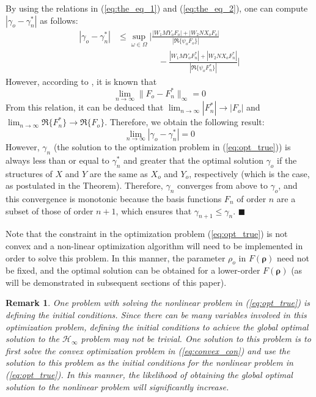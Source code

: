 \documentclass[letterpaper, 10 pt, conference]{ieeeconf}  %
\newtheorem*{remark*}{Remark}
\begin{document}
By using the relations in (\ref{eq:the_eq_1}) and (\ref{eq:the_eq_2}), one can compute $|\gamma_o - \gamma_n^*|$ as follows:
\begin{equation}
\begin{split}
|\gamma_o - \gamma_n^*|  & \leq \sup_{\omega \in \Omega} \bigg| \frac{|W_1MY_oF_o| + |W_2NX_oF_o|}{|\Re \{\psi_o F_o \}|}  \\  & \hspace{2cm}- \frac{|W_1MY_oF_n^*| + |W_2NX_oF_n^*|}{| \Re \{\psi_o F_n^* \}|} \bigg|
\end{split}
\end{equation}
However, according to \cite{AN99b}, it is known that
\begin{equation}
\lim_{n \to \infty} \|F_o - F_n^* \|_{\infty} = 0
\end{equation}
From this relation, it can be deduced that $\lim_{n \to \infty} |F_n^*| \rightarrow |F_o|$ and $\lim_{n \to \infty} \Re \{F_n^*\} \rightarrow \Re\{F_o\}$. Therefore, we obtain the following result:
\begin{equation}
\lim_{n \to \infty} |\gamma_o - \gamma_n^*|  = 0
\end{equation}
However, $\gamma_n$ (the solution to the optimization problem in (\ref{eq:opt_true})) is always less than or equal to $\gamma_n^*$ and greater that the optimal solution $\gamma_o$ if the structures of $X$ and $Y$ are the same as $X_o$ and $Y_o$, respectively (which is the case, as postulated in the Theorem). Therefore, $\gamma_n$ converges from above to $\gamma_o$, and this convergence is monotonic because the basis functions $F_n$ of order $n$ are a subset of those of order $n+1$, which ensures that $\gamma_{n+1} \leq \gamma_n$.
{\hfill \ensuremath{\blacksquare}}

Note that the constraint in the optimization problem (\ref{eq:opt_true}) is not convex and a non-linear optimization algorithm will need to be implemented in order to solve this problem. In this manner, the parameter $\rho_o$ in $F(\bm{\rho})$ need not be fixed, and the optimal solution can be obtained for a lower-order $F(\bm{\rho})$ (as will be demonstrated in subsequent sections of this paper).

\begin{remark*}
One problem with solving the nonlinear problem in (\ref{eq:opt_true}) is defining the initial conditions. Since there can be many variables involved in this optimization problem, defining the initial conditions to achieve the global optimal solution to the $\mathcal{H}_{\infty}$ problem may not be trivial. One solution to this problem is to first solve the convex optimization problem in (\ref{eq:convex_con}) and use the solution to this problem as the initial conditions for the nonlinear problem in (\ref{eq:opt_true}). In this manner, the likelihood of obtaining the global optimal solution to the nonlinear problem will significantly increase. 
\end{remark*}
\end{document}
